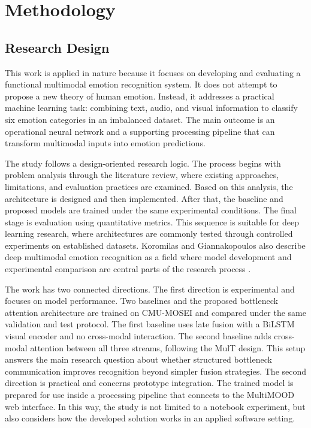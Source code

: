 
\chapter{Methodology}
\label{chap:methodology}

\section{Research Design}
\label{sec:research_design}

This work is applied in nature because it focuses on developing and evaluating a functional multimodal emotion recognition system. It does not attempt to propose a new theory of human emotion. Instead, it addresses a practical machine learning task: combining text, audio, and visual information to classify six emotion categories in an imbalanced dataset. The main outcome is an operational neural network and a supporting processing pipeline that can transform multimodal inputs into emotion predictions.

The study follows a design-oriented research logic. The process begins with problem analysis through the literature review, where existing approaches, limitations, and evaluation practices are examined. Based on this analysis, the architecture is designed and then implemented. After that, the baseline and proposed models are trained under the same experimental conditions. The final stage is evaluation using quantitative metrics. This sequence is suitable for deep learning research, where architectures are commonly tested through controlled experiments on established datasets. Koromilas and Giannakopoulos also describe deep multimodal emotion recognition as a field where model development and experimental comparison are central parts of the research process \cite{koromilas2021deep}.

The work has two connected directions. The first direction is experimental and focuses on model performance. Two baselines and the proposed bottleneck attention architecture are trained on CMU-MOSEI and compared under the same validation and test protocol. The first baseline uses late fusion with a BiLSTM visual encoder and no cross-modal interaction. The second baseline adds cross-modal attention between all three streams, following the MulT design. This setup answers the main research question about whether structured bottleneck communication improves recognition beyond simpler fusion strategies. The second direction is practical and concerns prototype integration. The trained model is prepared for use inside a processing pipeline that connects to the MultiMOOD web interface. In this way, the study is not limited to a notebook experiment, but also considers how the developed solution works in an applied software setting.


